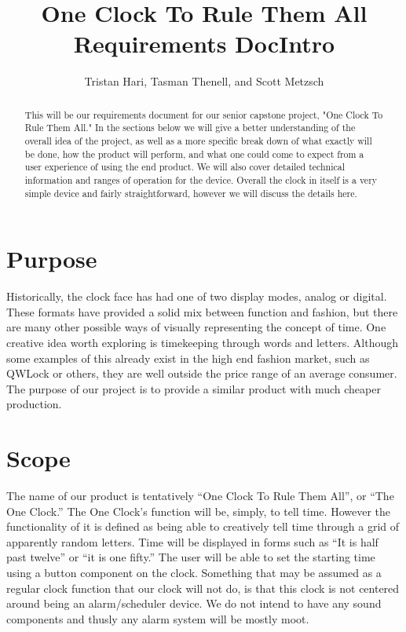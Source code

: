 \documentclass[10pt,draftclsnofoot,onecolumn]{IEEEtran}
\begin{document}
\title{One Clock To Rule Them All Requirements Doc}
\author{Tristan Hari, Tasman Thenell, and Scott Metzsch}
\maketitle
\begin{abstract}
This will be our requirements document for our senior capstone project, "One Clock To Rule Them All."
In the sections below we will give a better understanding of the overall idea of the project, as
well as a more specific break down of what exactly will be done, how the product will perform,
and what one could come to expect from a user experience of using the end product. We will also
cover detailed technical information and ranges of operation for the device. Overall the clock in
itself is a very simple device and fairly straightforward, however we will discuss the details here.
\end{abstract}
\IEEEpeerreviewmaketitle

\newpage
\tableofcontents
\newpage


\title{Intro}
\section{Purpose}
Historically, the clock face has had one of two display modes, analog or digital.
These formats have provided a solid mix between function and fashion, but there are many
other possible ways of visually representing the concept of time. One creative idea worth
exploring is timekeeping through words and letters. Although some examples of this already
exist in the high end fashion market, such as QWLock or others, they are well outside the
price range of an average consumer. The purpose of our project is to provide a similar
product with much cheaper production.

\section{Scope}
The name of our product is tentatively “One Clock To Rule Them All”, or “The One Clock.”
The One Clock’s function will be, simply, to tell time. However the functionality of it is
defined as being able to creatively tell time through a grid of apparently random letters.
Time will be displayed in forms such as “It is half past twelve” or “it is one fifty.” The
user will be able to set the starting time using a button component on the clock. Something
that may be assumed as a regular clock function that our clock will not do, is that this clock
 is not centered around being an alarm/scheduler device. We do not intend to have any sound
 components and thusly any alarm system will be mostly moot.
\end{document}
